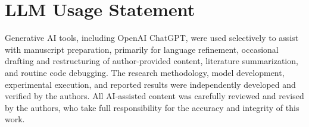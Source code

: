 \section*{LLM Usage Statement}

Generative AI tools, including OpenAI ChatGPT, were
used selectively to assist with manuscript preparation,
primarily for language refinement, occasional drafting
and restructuring of author-provided content, literature
summarization, and routine code debugging.
The research methodology, model development,
experimental execution, and reported results were
independently developed and verified by the authors.
All AI-assisted content was carefully reviewed and
revised by the authors, who take full responsibility
for the accuracy and integrity of this work.

